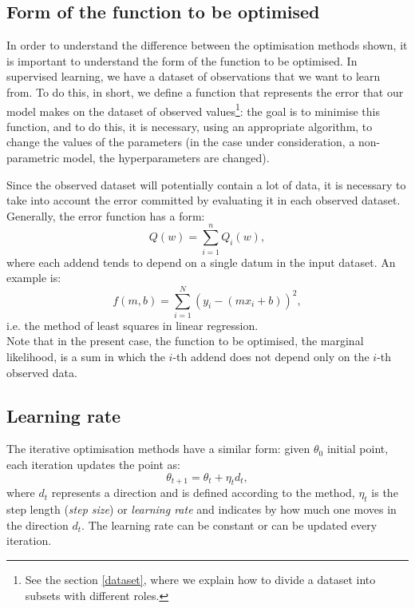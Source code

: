 \subsection{Form of the function to be optimised}\label{costfunction}
In order to understand the difference between the optimisation methods shown, it is important to understand the form of the function to be optimised.
In supervised learning, we have a dataset of observations that we want to learn from. To do this, in short, we define a function that represents the error that our model makes on the dataset of observed values\footnote{See the section \ref{dataset}, where we explain how to divide a dataset into subsets with different roles.}: the goal is to minimise this function, and to do this, it is necessary, using an appropriate algorithm, to change the values of the parameters (in the case under consideration, a non-parametric model, the hyperparameters are changed).

\newpage

Since the observed dataset will potentially contain a lot of data, it is necessary to take into account the error committed by evaluating it in each observed dataset. Generally, the error function has a form:
\[
Q(w)=\sum_{i=1}^{n}Q_i(w),
\]
where each addend tends to depend on a single datum in the input dataset. An example is:
\[
f(m,b)=\sum_{i=1}^{N}(y_i-(mx_i+b))^2,
\]
i.e. the method of least squares in linear regression.\\
Note that in the present case, the function to be optimised, the marginal likelihood, is a sum in which the $i$-th addend does not depend only on the $i$-th observed data.


\subsection{Learning rate}
The iterative optimisation methods have a similar form: given $\theta_0$ initial point, each iteration updates the point as:
\[
\theta_{t+1}=\theta_t+\eta_td_t,
\]
where $d_t$ represents a direction and is defined according to the method, $\eta_t$ is the step length (\textit{step size}) or \textit{learning rate} and indicates by how much one moves in the direction $d_t$. The learning rate can be constant or can be updated every iteration.


\newpage

